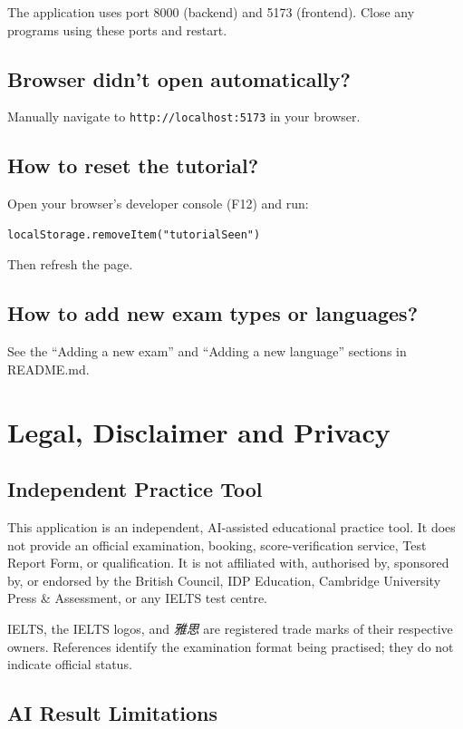\documentclass[12pt,a4paper]{article}
\begin{document}
The application uses port 8000 (backend) and 5173 (frontend). Close any programs using these ports and restart.

\subsection{Browser didn't open automatically?}

Manually navigate to \texttt{http://localhost:5173} in your browser.

\subsection{How to reset the tutorial?}

Open your browser's developer console (F12) and run:
\begin{verbatim}
localStorage.removeItem("tutorialSeen")
\end{verbatim}
Then refresh the page.

\subsection{How to add new exam types or languages?}

See the ``Adding a new exam'' and ``Adding a new language'' sections in README.md.

\newpage

\section{Legal, Disclaimer and Privacy}

\subsection{Independent Practice Tool}

This application is an independent, AI-assisted educational practice tool. It does not provide an official examination, booking, score-verification service, Test Report Form, or qualification. It is not affiliated with, authorised by, sponsored by, or endorsed by the British Council, IDP Education, Cambridge University Press \& Assessment, or any IELTS test centre.

IELTS, the IELTS logos, and \textit{雅思} are registered trade marks of their respective owners. References identify the examination format being practised; they do not indicate official status.

\subsection{AI Result Limitations}
\end{document}
